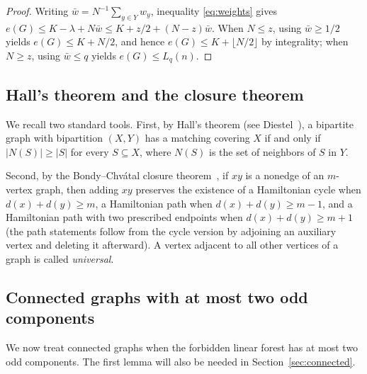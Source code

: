 \documentclass[10pt]{article}
\theoremstyle{compactplain}
\theoremstyle{remark}\newtheorem{remark}[theorem]{Remark}
\begin{document}
\begin{proof}
Writing $\bar w=N^{-1}\sum_{y\in Y}w_y$, inequality \eqref{eq:weights}
gives $e(G)\le K-\lambda+N\bar w\le K+z/2+(N-z)\bar w$. When $N\le z$,
using $\bar w\ge1/2$ yields $e(G)\le K+N/2$, and hence
$e(G)\le K+\lfloor N/2\rfloor$ by integrality; when $N\ge z$, using
$\bar w\le q$ yields $e(G)\le L_q(n)$.
\end{proof}

\subsection{Hall's theorem and the closure theorem}

We recall two standard tools. First, by Hall's theorem (see
Diestel~\cite[Chapter~2]{Diestel}), a bipartite graph with bipartition
$(X,Y)$ has a matching covering $X$ if and only if $|N(S)|\ge|S|$ for
every $S\subseteq X$, where $N(S)$ is the set of neighbors of $S$ in
$Y$.

Second, by the Bondy--Chv\'atal closure theorem~\cite{BondyChvatal}, if
$xy$ is a nonedge of an $m$-vertex graph, then adding $xy$ preserves the
existence of a Hamiltonian cycle when $d(x)+d(y)\ge m$, a Hamiltonian
path when $d(x)+d(y)\ge m-1$, and a Hamiltonian path with two prescribed
endpoints when $d(x)+d(y)\ge m+1$ (the path statements follow from the
cycle version by adjoining an auxiliary vertex and deleting it
afterward). A vertex adjacent to all other vertices of a graph is called
\emph{universal}.

\subsection{Connected graphs with at most two odd components}

We now treat connected graphs when the forbidden linear forest has at
most two odd components. The first lemma will also be needed in
Section~\ref{sec:connected}.
\end{document}
